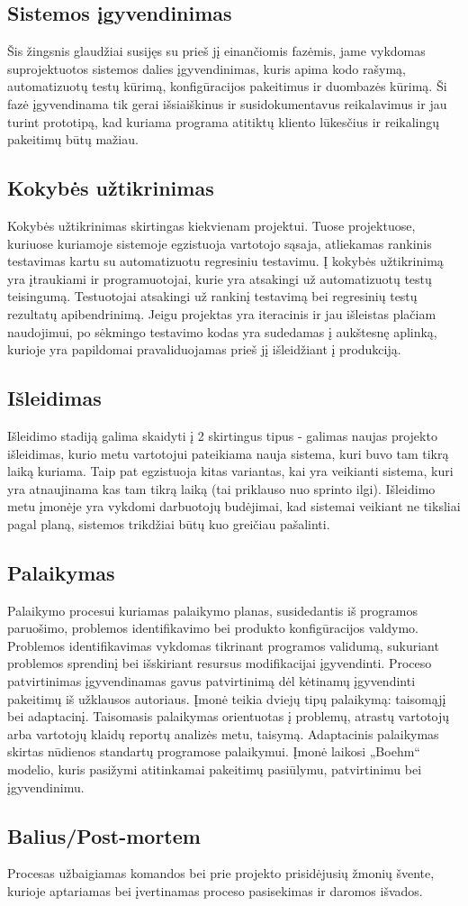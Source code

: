 \documentclass{VUMIFPSkursinis}
\begin{document}
	\subsection{Sistemos įgyvendinimas}
	Šis žingsnis glaudžiai susijęs su prieš jį einančiomis fazėmis, jame vykdomas suprojektuotos sistemos dalies įgyvendinimas, kuris apima kodo rašymą, automatizuotų testų kūrimą, konfigūracijos pakeitimus ir duombazės kūrimą. Ši fazė įgyvendinama tik gerai išsiaiškinus ir susidokumentavus reikalavimus ir jau turint prototipą, kad kuriama programa atitiktų kliento lūkesčius ir reikalingų pakeitimų būtų mažiau.
	\subsection{Kokybės užtikrinimas}
	Kokybės užtikrinimas skirtingas kiekvienam projektui. Tuose projektuose, kuriuose kuriamoje sistemoje egzistuoja vartotojo sąsaja, atliekamas rankinis testavimas kartu su automatizuotu regresiniu testavimu. Į kokybės užtikrinimą yra įtraukiami ir programuotojai, kurie yra atsakingi už automatizuotų testų teisingumą. Testuotojai atsakingi už rankinį testavimą bei regresinių testų rezultatų apibendrinimą. Jeigu projektas yra iteracinis ir jau išleistas plačiam naudojimui, po sėkmingo testavimo kodas yra sudedamas į aukštesnę aplinką, kurioje yra papildomai pravaliduojamas prieš jį išleidžiant į produkciją.
	\subsection{Išleidimas}
	Išleidimo stadiją galima skaidyti į 2 skirtingus tipus - galimas naujas projekto išleidimas, kurio metu vartotojui pateikiama nauja sistema, kuri buvo tam tikrą laiką kuriama. Taip pat egzistuoja kitas variantas, kai yra veikianti sistema, kuri yra atnaujinama kas tam tikrą laiką (tai priklauso nuo sprinto ilgi). Išleidimo metu įmonėje yra vykdomi darbuotojų budėjimai, kad sistemai veikiant ne tiksliai pagal planą, sistemos trikdžiai būtų kuo greičiau pašalinti.
	\subsection{Palaikymas}
	Palaikymo procesui kuriamas palaikymo planas, susidedantis iš programos paruošimo, problemos identifikavimo bei produkto konfigūracijos valdymo. Problemos identifikavimas vykdomas tikrinant programos validumą, sukuriant problemos sprendinį bei išskiriant resursus modifikacijai įgyvendinti. Proceso patvirtinimas įgyvendinamas gavus patvirtinimą dėl kėtinamų įgyvendinti pakeitimų  iš užklausos autoriaus. Įmonė teikia dviejų tipų palaikymą: taisomąjį bei adaptacinį. Taisomasis palaikymas orientuotas į problemų, atrastų vartotojų arba vartotojų klaidų reportų analizės metu, taisymą. Adaptacinis palaikymas skirtas nūdienos standartų programose palaikymui. Įmonė laikosi „Boehm“ modelio, kuris pasižymi atitinkamai pakeitimų pasiūlymu, patvirtinimu bei įgyvendinimu.
	\label{img:boehmsModel} 

	\subsection{Balius/Post-mortem}
	Procesas užbaigiamas komandos bei prie projekto prisidėjusių žmonių švente, kurioje aptariamas bei įvertinamas proceso pasisekimas ir daromos išvados.

\end{document}

